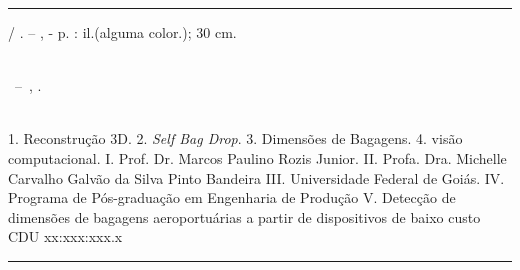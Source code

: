 \imprimircapa
\imprimirfolhaderosto

\begin{fichacatalografica}
    \vspace*{15cm} 
    \hrule 
    \begin{center} 
    \begin{minipage}[c]{12.5cm} 
        \imprimirautor
        \hspace{0.5cm} \imprimirtitulo / \imprimirautor. --
        \imprimirlocal, \imprimirdata-
        \hspace{0.5cm} \pageref{LastPage} p. : il.(alguma color.); 30 cm.\\
        \hspace{0.5cm} \imprimirorientadorRotulo \imprimirorientador\\
        \hspace{0.5cm}
        \parbox[t]{\textwidth}{\imprimirtipotrabalho~--~\imprimirinstituicao,
        \imprimirdata.}\\
        \hspace{0.5cm}
        1. Reconstrução 3D. 
        2. \textit{Self Bag Drop}.
        3. Dimensões de Bagagens.
        4. visão computacional.
        I. Prof. Dr. Marcos Paulino Rozis Junior.
        II. Profa. Dra. Michelle Carvalho Galvão da Silva Pinto Bandeira 
        III. Universidade Federal de Goiás.
        IV. Programa de Pós-graduação em Engenharia de Produção
        V. Detecção de dimensões de bagagens aeroportuárias a partir de dispositivos de baixo custo\\
        \hspace{8.75cm} CDU xx:xxx:xxx.x\\
    \end{minipage}
    \end{center}
    \hrule
\end{fichacatalografica}

